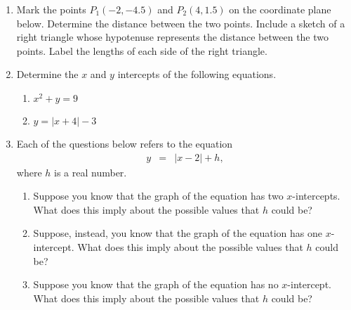\begin{enumerate}

\item Mark the points $P_1(-2,-4.5)$ and $P_2(4,1.5)$ on the
  coordinate plane below. Determine the distance between the two
  points.  Include a sketch of a right triangle whose hypotenuse
  represents the distance between the two points. Label the lengths of
  each side of the right triangle.



\newpage


\item Determine the $x$ and $y$ intercepts of the following equations.
\begin{enumerate}
\item $x^2+y=9$
\vfill
\item $y=|x+4|-3$
\end{enumerate}
\vfill

\item Each of the questions below refers to the equation
  \begin{eqnarray*}
    y & = & |x-2| + h,
  \end{eqnarray*}
  where $h$ is a real number.
  \begin{enumerate}
  \item Suppose you know that the graph of the equation has two
    $x$-intercepts. What does this imply about the possible values
    that $h$ could be?
    \vfill
  \item Suppose, instead, you know that the graph of the equation has
    one $x$-intercept. What does this imply about the possible values
    that $h$ could be?
    \vfill
  \item Suppose you know that the graph of the equation has no
    $x$-intercept. What does this imply about the possible values
    that $h$ could be?
    \vfill
  \end{enumerate}


\end{enumerate}
